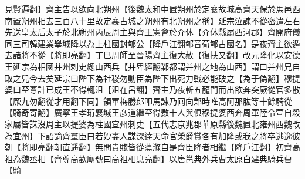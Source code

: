 見賢遍翻】齊主告以欲向北朔州【後魏太和中置朔州於定襄故城高齊天保於馬邑西南置朔州相去三百八十里故定襄古城之朔州有北朔州之稱】延宗泣諫不從密遣左右先送皇太后太子於北朔州丙辰周主與齊王憲會於介休【介休縣屬西河郡】齊開府儀同三司韓建業舉城降以為上柱國封郇公【降戶江翻郇音荀郇古國名】是夜齊主欲遁去諸將不從【將即亮翻】丁巳周師至晉陽齊主復大赦【復扶又翻】改元隆化以安德王延宗為相國并州刺史總山西兵【并卑經翻鄴都謂并州之地為山西】謂曰并州兄自取之兒今去矣延宗曰陛下為社稷勿動臣為陛下出死力戰必能破之【為于偽翻】穆提婆曰至尊計已成王不得輒沮【沮在呂翻】齊主乃夜斬五龍門而出欲奔突厥從官多散【厥九勿翻從才用翻下同】領軍梅勝郎叩馬諫乃囘向鄴時唯高阿那肱等十餘騎從【騎奇寄翻】廣寧王孝珩襄城王彦道繼至得數十人與俱穆提婆西奔周軍陸令萱自殺家屬皆誅沒周主以提婆為柱國宜州刺史【五代志京兆郡華原縣後魏置北雍州西魏改為宜州】下詔諭齊羣臣曰若妙盡人謀深逹天命官榮爵賞各有加隆或我之將卒逃逸彼朝【將即亮翻朝直遥翻】無問貴賤皆從蕩滌自是齊臣降者相繼【降戶江翻】初齊高祖為魏丞相【齊尊高歡廟號曰高祖相息亮翻】以唐邕典外兵曹太原白建典騎兵曹【騎